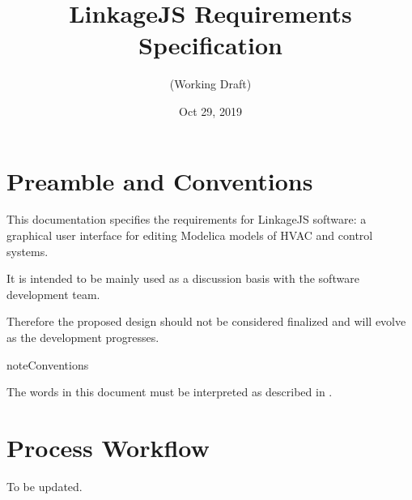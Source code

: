 \documentclass[letterpaper,10pt, openany,english]{sphinxmanual}
\title{LinkageJS Requirements Specification}
\date{Oct 29, 2019}
\author{(Working Draft)}
\begin{document}
\pagestyle{empty}
\sphinxmaketitle
\pagestyle{plain}
\sphinxtableofcontents
\pagestyle{normal}
\label{\detokenize{index::doc}}




\pagestyle{plain}


\chapter{Preamble and Conventions}
\label{\detokenize{preamble:preamble-and-conventions}}\label{\detokenize{preamble::doc}}
This documentation specifies the requirements for LinkageJS software: a graphical user interface for editing Modelica models of HVAC and control systems.

It is intended to be mainly used as a discussion basis with the software development team.

Therefore the proposed design should not be considered finalized and will evolve as the development progresses.

\begin{sphinxadmonition}{note}{Conventions}

The words  in this document must be interpreted as described in .
\end{sphinxadmonition}


\chapter{Process Workflow}
\label{\detokenize{process:process-workflow}}\label{\detokenize{process:sec-process}}\label{\detokenize{process::doc}}
To be updated.
\end{document}
